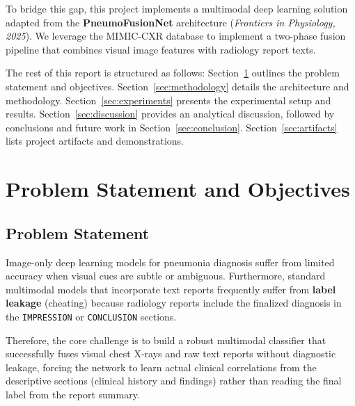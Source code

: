 \documentclass[11pt,a4paper]{article}
\begin{document}
To bridge this gap, this project implements a multimodal deep learning solution adapted from the \textbf{PneumoFusionNet} architecture (\textit{Frontiers in Physiology, 2025}). We leverage the MIMIC-CXR database to implement a two-phase fusion pipeline that combines visual image features with radiology report texts. 

The rest of this report is structured as follows: Section~\ref{sec:problem} outlines the problem statement and objectives. Section~\ref{sec:methodology} details the architecture and methodology. Section~\ref{sec:experiments} presents the experimental setup and results. Section~\ref{sec:discussion} provides an analytical discussion, followed by conclusions and future work in Section~\ref{sec:conclusion}. Section~\ref{sec:artifacts} lists project artifacts and demonstrations.

\section{Problem Statement and Objectives} \label{sec:problem}

\subsection{Problem Statement}
Image-only deep learning models for pneumonia diagnosis suffer from limited accuracy when visual cues are subtle or ambiguous. Furthermore, standard multimodal models that incorporate text reports frequently suffer from \textbf{label leakage} (cheating) because radiology reports include the finalized diagnosis in the \texttt{IMPRESSION} or \texttt{CONCLUSION} sections. 

Therefore, the core challenge is to build a robust multimodal classifier that successfully fuses visual chest X-rays and raw text reports without diagnostic leakage, forcing the network to learn actual clinical correlations from the descriptive sections (clinical history and findings) rather than reading the final label from the report summary.
\end{document}
